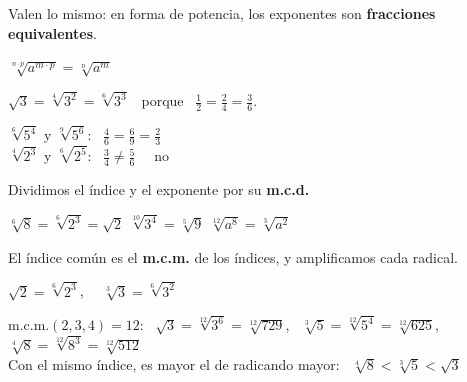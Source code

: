 \documentclass[11pt,a4paper]{article}
\newcommand{\be}[1]{{\color{fmok}\faCheckCircle}\ \ensuremath{#1}}
\newcommand{\mal}[1]{{\color{fmR}\faTimesCircle}\ {\color{fmR}\ensuremath{#1}}}
\begin{document}
\vfill
\begin{minipage}[c]{0.55\linewidth}
\begin{idea}
Valen lo mismo: en forma de potencia, los exponentes son \textbf{fracciones equivalentes}.\\[4pt]
{\centering\Large$\sqrt[n\cdot p]{a^{m\cdot p}}=\sqrt[n]{a^m}$\par}\smallskip
$\sqrt3=\sqrt[4]{3^2}=\sqrt[6]{3^3}$ \ porque \ $\frac12=\frac24=\frac36$.
\end{idea}
\end{minipage}\hfill
\begin{minipage}[c]{0.42\linewidth}
\begin{exemple}
$\sqrt[6]{5^4}$ y $\sqrt[9]{5^6}$: \ $\frac46=\frac69=\frac23$ \ \be{}\\[3pt]
$\sqrt[4]{2^3}$ y $\sqrt[6]{2^5}$: \ $\frac34\neq\frac56$ \ \mal{\text{no}}
\end{exemple}
\end{minipage}

\vfill
\begin{tcbraster}[raster columns=2,raster equal height,raster column skip=10pt]
\begin{tcolorbox}[fmbase,colback=fmK!8,colframe=fmK,coltitle=white,title={\faSearchMinus\ \ Simplificar}]
Dividimos el índice y el exponente por su \textbf{m.c.d.}\par\smallskip
$\sqrt[6]{8}=\sqrt[6]{2^3}=\sqrt2$ \qquad $\sqrt[10]{3^4}=\sqrt[5]{9}$ \qquad $\sqrt[12]{a^8}=\sqrt[3]{a^2}$
\end{tcolorbox}
\begin{tcolorbox}[fmbase,colback=fmA!8,colframe=fmA,coltitle=white,title={\faSearchPlus\ \ Reducir a índice común}]
El índice común es el \textbf{m.c.m.} de los índices, y amplificamos cada radical.\par\smallskip
$\sqrt2=\sqrt[6]{2^3}$, \ \ $\sqrt[3]{3}=\sqrt[6]{3^2}$
\end{tcolorbox}
\end{tcbraster}

\vfill
\begin{exemple}
m.c.m.$(2,3,4)=12$: \ $\sqrt3=\sqrt[12]{3^6}=\sqrt[12]{729}$, \ $\sqrt[3]{5}=\sqrt[12]{5^4}=\sqrt[12]{625}$, \ $\sqrt[4]{8}=\sqrt[12]{8^3}=\sqrt[12]{512}$\\[4pt]
Con el mismo índice, es mayor el de radicando mayor: \ $\boxed{\sqrt[4]{8}<\sqrt[3]{5}<\sqrt3}$
\end{exemple}
\end{document}
